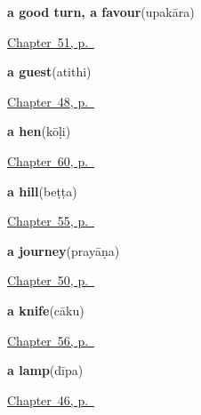 \noindent\begin{minipage}[t]{\linewidth}
\raggedright
\textbf{a good turn, a favour}\enspace\emph{}\enspace(upakāra)\par
\footnotesize \hyperref[ch:ka-courtesy]{Chapter~51, p.~\pageref*{ch:ka-courtesy}}
\end{minipage}\par\smallskip

\noindent\begin{minipage}[t]{\linewidth}
\raggedright
\textbf{a guest}\enspace\emph{}\enspace(atithi)\par
\footnotesize \hyperref[ch:ka-roles]{Chapter~48, p.~\pageref*{ch:ka-roles}}
\end{minipage}\par\smallskip

\noindent\begin{minipage}[t]{\linewidth}
\raggedright
\textbf{a hen}\enspace\emph{}\enspace(kōḷi)\par
\footnotesize \hyperref[ch:ka-animals]{Chapter~60, p.~\pageref*{ch:ka-animals}}
\end{minipage}\par\smallskip

\noindent\begin{minipage}[t]{\linewidth}
\raggedright
\textbf{a hill}\enspace\emph{}\enspace(beṭṭa)\par
\footnotesize \hyperref[ch:ka-river-road]{Chapter~55, p.~\pageref*{ch:ka-river-road}}
\end{minipage}\par\smallskip

\noindent\begin{minipage}[t]{\linewidth}
\raggedright
\textbf{a journey}\enspace\emph{}\enspace(prayāṇa)\par
\footnotesize \hyperref[ch:ka-leave-more]{Chapter~50, p.~\pageref*{ch:ka-leave-more}}
\end{minipage}\par\smallskip

\noindent\begin{minipage}[t]{\linewidth}
\raggedright
\textbf{a knife}\enspace\emph{}\enspace(cāku)\par
\footnotesize \hyperref[ch:ka-house]{Chapter~56, p.~\pageref*{ch:ka-house}}
\end{minipage}\par\smallskip

\noindent\begin{minipage}[t]{\linewidth}
\raggedright
\textbf{a lamp}\enspace\emph{}\enspace(dīpa)\par
\footnotesize \hyperref[ch:ka-ask-for]{Chapter~46, p.~\pageref*{ch:ka-ask-for}}
\end{minipage}\par\smallskip

